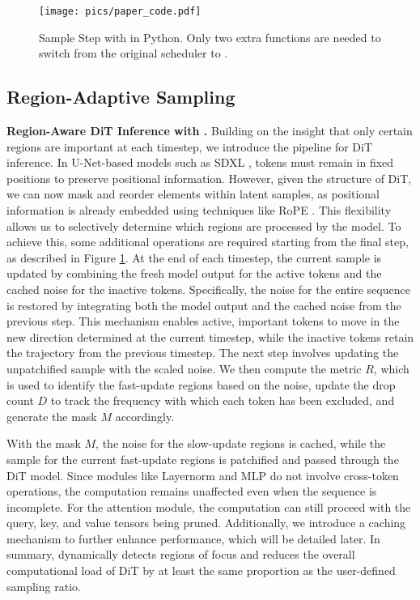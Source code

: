 \begin{figure}[htbp]
    \centering
    \texttt{[image: pics/paper\_code.pdf]} 
    \caption{Sample Step with \ourmethod{} in Python. Only two extra functions are needed to switch from the original scheduler to \ourmethod{}.}
    \label{fig:code}
\end{figure}

\subsection{Region-Adaptive Sampling}

\textbf{Region-Aware DiT Inference with \ourmethod{}.} Building on the insight that only certain regions are important at each timestep, we introduce the \ourmethod{} pipeline for DiT inference. In U-Net-based models such as SDXL \cite{podell2023sdxlimprovinglatentdiffusion}, tokens must remain in fixed positions to preserve positional information. However, given the structure of DiT, we can now mask and reorder elements within latent samples, as positional information is already embedded using techniques like RoPE \cite{su2024roformer}. This flexibility allows us to selectively determine which regions are processed by the model.
To achieve this, some additional operations are required starting from the final step, as described in Figure \ref{fig:code}. At the end of each timestep, the current sample is updated by combining the fresh model output for the active tokens and the cached noise for the inactive tokens. Specifically, the noise for the entire sequence is restored by integrating both the model output and the cached noise from the previous step. This mechanism enables active, important tokens to move in the new direction determined at the current timestep, while the inactive tokens retain the trajectory from the previous timestep. The next step involves updating the unpatchified sample with the scaled noise. We then compute the metric $R$, which is used to identify the fast-update regions based on the noise, update the drop count $D$ to track the frequency with which each token has been excluded, and generate the mask $M$ accordingly.

With the mask $M$, the noise for the slow-update regions is cached, while the sample for the current fast-update regions is patchified and passed through the DiT model. Since modules like Layernorm and MLP do not involve cross-token operations, the computation remains unaffected even when the sequence is incomplete. For the attention \cite{vaswani2017attention} module, the computation can still proceed with the query, key, and value tensors being pruned. Additionally, we introduce a caching mechanism to further enhance performance, which will be detailed later. In summary, \ourmethod{} dynamically detects regions of focus and reduces the overall computational load of DiT by at least the same proportion as the user-defined sampling ratio.

